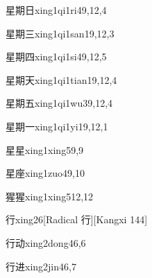 \begin{entry}{星期日}{xing1qi1ri4}{9,12,4}
\end{entry}

\begin{entry}{星期三}{xing1qi1san1}{9,12,3}
\end{entry}

\begin{entry}{星期四}{xing1qi1si4}{9,12,5}
\end{entry}

\begin{entry}{星期天}{xing1qi1tian1}{9,12,4}
\end{entry}

\begin{entry}{星期五}{xing1qi1wu3}{9,12,4}
\end{entry}

\begin{entry}{星期一}{xing1qi1yi1}{9,12,1}
\end{entry}

\begin{entry}{星星}{xing1xing5}{9,9}
\end{entry}

\begin{entry}{星座}{xing1zuo4}{9,10}
\end{entry}

\begin{entry}{猩猩}{xing1xing5}{12,12}
\end{entry}

\begin{entry}{行}{xing2}{6}[Radical 行][Kangxi 144]
\end{entry}

\begin{entry}{行动}{xing2dong4}{6,6}
\end{entry}

\begin{entry}{行进}{xing2jin4}{6,7}
\end{entry}

